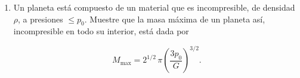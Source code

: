 \begin{enumerate}
$$ M(r) = M_0\left[1 + \left(\frac{r}{r_0}\right)^2\right]^{-3/2}. $$

donde $M(r)$ es la masa encerrada en el radio $r$, y $M_0$ y $r_0$ son constantes. Determine (a) la distribución de densidad y (b) la distribución de presión dentro de la estrella. Muestre que la estrella puede describirse como un politropo y determine el índice politrópico $n$.

\item Un planeta está compuesto de un material que es incompresible, de densidad $\rho$, a presiones $\le p_0$. Muestre que la masa máxima de un planeta así, incompresible en todo su interior, está dada por

$$ M_{\mathrm{max}} = 2^{1/2}\,\pi\left(\frac{3p_0}{G}\right)^{3/2}. $$
\end{enumerate}
